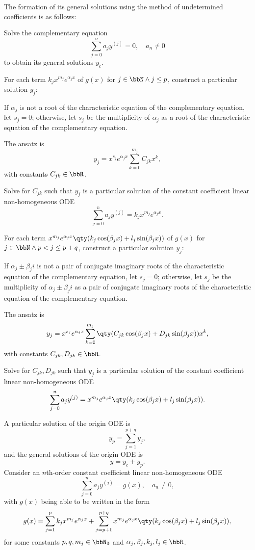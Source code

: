 \documentclass[a4paper,12pt]{report}
\begin{document}
The formation of its general solutions using the method of undetermined coefficients is as follows:
\ben
\item Solve the complementary equation
\[\sum_{j=0}^na_jy^{(j)}=0,\quad a_n\neq 0\]
to obtain its general solutions $y_c$.
\item For each term $k_jx^{m_j}e^{\alpha_jx}$ of $g(x)$ for $j\in\bbN\land j\leq p$, construct a particular solution $y_j$:
\ben
\item If $\alpha_j$ is not a root of the characteristic equation of the complementary equation, let $s_j=0$; otherwise, let $s_j$ be the multiplicity of $\alpha_j$ as a root of the characteristic equation of the complementary equation.
\item The ansatz is
\[y_j=x^{s_j}e^{\alpha_jx}\sum_{k=0}^{m_j}C_{jk}x^k,\]
with constants $C_{jk}\in\bbR$.
\item Solve for $C_{jk}$ such that $y_j$ is a particular solution of the constant coefficient linear non-homogeneous ODE
\[\sum_{j=0}^na_jy^{(j)}=k_jx^{m_j}e^{\alpha_jx}.\]
\een
\item For each term $x^{m_j}e^{\alpha_jx}\qty(k_j\cos(\beta_jx)+l_j\sin(\beta_jx))$ of $g(x)$ for $j\in\bbN\land p<j\leq p+q$, construct a particular solution $y_j$:
\ben
\item If $\alpha_j\pm\beta_ji$ is not a pair of conjugate imaginary roots of the characteristic equation of the complementary equation, let $s_j=0$; otherwise, let $s_j$ be the multiplicity of $\alpha_j\pm\beta_ji$ as a pair of conjugate imaginary roots of the characteristic equation of the complementary equation.
\item The ansatz is
\[y_j=x^{s_j}e^{\alpha_jx}\sum_{k=0}^{m_j}\qty(C_{jk}\cos(\beta_jx)+D_{jk}\sin(\beta_jx))x^k,\]
with constants $C_{jk},D_{jk}\in\bbR$.
\item Solve for $C_{jk},D_{jk}$ such that $y_j$ is a particular solution of the constant coefficient linear non-homogeneous ODE
\[\sum_{j=0}^na_jy^{(j)}=x^{m_j}e^{\alpha_jx}\qty(k_j\cos(\beta_jx)+l_j\sin(\beta_jx)).\]
\een
\item A particular solution of the origin ODE is
\[y_p=\sum_{j=1}^{p+q}y_j,\]
and the general solutions of the origin ODE is
\[y=y_c+y_p.\]
\een
{}
Consider an $n$th-order constant coefficient linear non-homogeneous ODE
\[\sum_{j=0}^na_jy^{(j)}=g(x),\quad a_n\neq 0,\]
with $g(x)$ being able to be written in the form
\[g(x)=\sum_{j=1}^pk_jx^{m_j}e^{\alpha_jx}+\sum_{j=p+1}^{p+q}x^{m_j}e^{\alpha_jx}\qty(k_j\cos(\beta_jx)+l_j\sin(\beta_jx)),\]
for some constants $p,q,m_j\in\bbN_0$ and $\alpha_j,\beta_j,k_j,l_j\in\bbR$.
\end{document}
